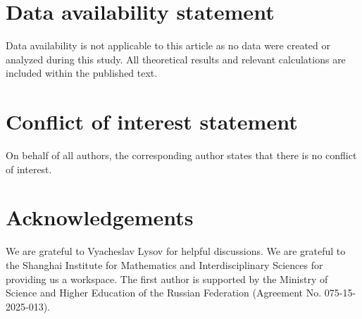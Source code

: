 \documentclass[10pt,a4paper]{amsart}
\theoremstyle{definition}
\begin{document}
\section*{Data availability statement}
Data availability is not applicable to this article as no data were created or analyzed during this study. All theoretical results and relevant calculations are included within the published text.

\section*{Conflict of interest statement}
On behalf of all authors, the corresponding author states that there is no conflict of interest.

\section*{Acknowledgements}
We are grateful to Vyacheslav Lysov for helpful discussions. We are grateful to the Shanghai Institute for Mathematics and Interdisciplinary Sciences for providing us a workspace. The first author is supported by the Ministry of Science and Higher Education of the Russian Federation (Agreement No. 075-15-2025-013).



\end{document}
